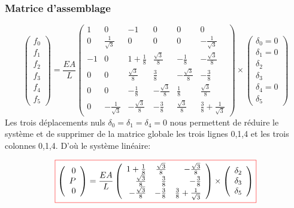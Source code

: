 \documentclass{beamer}
\newcommand{\myredbox}[1]{\fcolorbox{red}{white}{$\displaystyle#1$}}
\begin{document}
\begin{frame}
\frametitle{Matrice d'assemblage}
\[\left(\begin{array}{r}f_0\\ f_1\\f_2\\f_3\\f_4\\f_5 \end{array}\right) 
 =\frac{EA}{L}\left(\begin{array}{rrccrr} 
1&0&-1&0&0&0\\
0&\frac{1}{\sqrt 3}&0&0&0&-\frac{1}{\sqrt 3}\\
-1&0&1+\frac 18&\frac{\sqrt 3}{8}&-\frac 18&-\frac{\sqrt 3}{8}\\
0&0&\frac{\sqrt 3}{8}&\frac 38&-\frac{\sqrt 3}{8}&-\frac 38\\
0&0&-\frac 18&-\frac{\sqrt 3}{8}&\frac 18&\frac{\sqrt 3}{8}\\
0&-\frac{1}{\sqrt 3}&-\frac{\sqrt 3}{8}&-\frac 38&\frac{\sqrt 3}{8}&\frac{ 3}{8}+\frac{1}{\sqrt 3}
\end{array}\right)
\times
\left(\begin{array}{l}  \delta_0=0\\ \delta_1=0\\ \delta_2\\ \delta_3\\ \delta_4=0\\ \delta_5   \end{array}\right)
\]
Les trois déplacements nuls $\delta_0=\delta_1=\delta_4=0$ nous permettent de réduire le système et de supprimer de la matrice globale les trois lignes 0,1,4 et les trois colonnes 0,1,4. D'où le système linéaire:

\[\myredbox{
\left(\begin{array}{r} 0\\P\\0 \end{array}\right) 
=
\frac{EA}{L}\left(\begin{array}{rrr} 
1+\frac 18&\frac{\sqrt 3}{8}&-\frac{\sqrt 3}{8}\\
\frac{\sqrt 3}{8}&\frac 38&-\frac 38\\
-\frac{\sqrt 3}{8}&-\frac 38&\frac{ 3}{8}+\frac{1}{\sqrt 3}
\end{array}\right)
\times
\left(\begin{array}{r}   \delta_2\\ \delta_3\\ \delta_5  \end{array}\right) }
\]
\end{frame}
\end{document}
